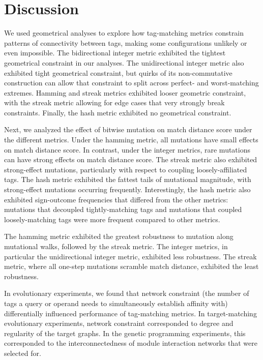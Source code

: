 \section{Discussion}


% 
We used geometrical analyses to explore how tag-matching metrics constrain patterns of connectivity between tags, making some configurations unlikely or even impossible.
The bidirectional integer metric exhibited the tightest geometrical constraint in our analyses.
The unidirectional integer metric also exhibited tight geometrical constraint, but quirks of its non-commutative construction can allow that constraint to split across perfect- and worst-matching extremes.
Hamming and streak metrics exhibited looser geometric constraint, with the streak metric allowing for edge cases that very strongly break constraints.
Finally, the hash metric exhibited no geometrical constraint.

Next, we analyzed the effect of bitwise mutation on match distance score under the different metrics.
Under the hamming metric, all mutations have small effects on match distance score.
In contrast, under the integer metrics, rare mutations can have strong effects on match distance score.
The streak metric also exhibited strong-effect mutations, particularly with respect to coupling loosely-affiliated tags.
The hash metric exhibited the fattest tails of mutational magnitude, with strong-effect mutations occurring frequently.
Interestingly, the hash metric also exhibited sign-outcome frequencies that differed from the other metrics: mutations that decoupled tightly-matching tags and mutations that coupled loosely-matching tags were more frequent compared to other metrics.

The hamming metric exhibited the greatest robustness to mutation along mutational walks, followed by the streak metric.
The integer metrics, in particular the unidirectional integer metric, exhibited less robustness.
The streak metric, where all one-step mutations scramble match distance, exhibited the least robustness.

In evolutionary experiments, we found that network constraint (the number of tags a query or operand needs to simultaneously establish affinity with) differentially influenced performance of tag-matching metrics. 
In target-matching evolutionary experiments, network constraint corresponded to degree and regularity of the target graphs.
In the genetic programming experiments, this corresponded to the interconnectedness of module interaction networks that were selected for.


